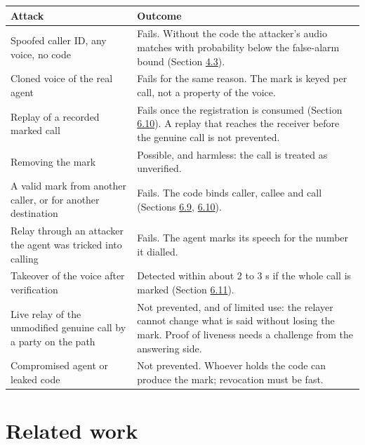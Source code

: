 \documentclass[10pt,a4paper]{article}
\begin{document}
{\def\LTcaptype{none} %
\begin{longtable}[]{@{}
  >{\raggedright\arraybackslash}p{}
  >{\raggedright\arraybackslash}p{}@{}}
\toprule\noalign{}
\begin{minipage}[b]{\linewidth}\raggedright
Attack
\end{minipage} & \begin{minipage}[b]{\linewidth}\raggedright
Outcome
\end{minipage} \\
\midrule\noalign{}
\endhead
\bottomrule\noalign{}
\endlastfoot
Spoofed caller ID, any voice, no code & Fails. Without the code the attacker's audio matches with probability below the false-alarm bound (Section \hyperref[s-4-3]{4.3}). \\
Cloned voice of the real agent & Fails for the same reason. The mark is keyed per call, not a property of the voice. \\
Replay of a recorded marked call & Fails once the registration is consumed (Section \hyperref[s-6-10]{6.10}). A replay that reaches the receiver before the genuine call is not prevented. \\
Removing the mark & Possible, and harmless: the call is treated as unverified. \\
A valid mark from another caller, or for another destination & Fails. The code binds caller, callee and call (Sections \hyperref[s-6-9]{6.9}, \hyperref[s-6-10]{6.10}). \\
Relay through an attacker the agent was tricked into calling & Fails. The agent marks its speech for the number it dialled. \\
Takeover of the voice after verification & Detected within about 2 to 3 s if the whole call is marked (Section \hyperref[s-6-11]{6.11}). \\
Live relay of the unmodified genuine call by a party on the path & Not prevented, and of limited use: the relayer cannot change what is said without losing the mark. Proof of liveness needs a challenge from the answering side. \\
Compromised agent or leaked code & Not prevented. Whoever holds the code can produce the mark; revocation must be fast. \\
\end{longtable}
}

\section{Related work}\label{s-3}
\end{document}
